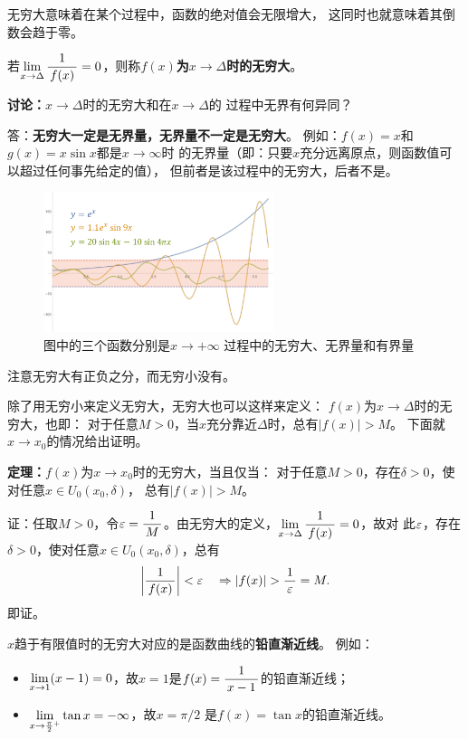 无穷大意味着在某个过程中，函数的绝对值会无限增大，
这同时也就意味着其倒数会趋于零。

\begin{thx}
	若$\lim\limits_{x\to{\Delta}}\displaystyle\frac{\,{1}\,}{\,{f(x)}\,}=0$，则称{\bf $f(x)$为$x\to\Delta$时的无穷大}。
\end{thx}

{\bf 讨论：}$x\to\Delta$时的无穷大和在$x\to\Delta$的
过程中无界有何异同？

\ifhint
答：{\bf 无穷大一定是无界量，无界量不一定是无穷大}。
例如：$f(x)=x$和$g(x)=x\sin x$都是$x\to\infty$时
的无界量（即：只要$x$充分远离原点，则函数值可以超过任何事先给定的值），
但前者是该过程中的无穷大，后者不是。\fin
\fi

\begin{figure}[h]
	\centering
	\includegraphics[width=0.6\textwidth]
	{./Images/Ch01/infvsbded.pdf}
	\caption{图中的三个函数分别是$x\to+\infty$
	过程中的无穷大、无界量和有界量}
	\label{fig:infvsbded}
\end{figure}

注意无穷大有正负之分，而无穷小没有。

\bs

除了用无穷小来定义无穷大，无穷大也可以这样来定义：
$f(x)$为$x\to\Delta$时的无穷大，也即：
对于任意$M>0$，当$x$充分靠近$\Delta$时，总有$|f(x)|>M$。
下面就$x\to x_0$的情况给出证明。

\begin{thx}
	{\bf 定理：}$f(x)$为$x\to x_0$时的无穷大，当且仅当：
	对于任意$M>0$，存在$\delta>0$，使对任意$x\in U_0(x_0,\delta)$，
	总有$|f(x)|>M$。
\end{thx}

证：任取$M>0$，令$\varepsilon=\displaystyle\frac{\,{1}\,}{\,{M}\,}$。由无穷大的定义，$\lim\limits_{x\to{\Delta}}\displaystyle\frac{\,{1}\,}{\,{f(x)}\,}=0$，故对
此$\varepsilon$，存在$\delta>0$，使对任意$x\in U_0(x_0,\delta)$，总有
$$\left|\df1{f(x)}\right|<\e\quad\Rightarrow |f(x)|>\df1{\e}=M.$$
即证。\fin

\bs
$x$趋于有限值时的无穷大对应的是函数曲线的{\bf 铅直渐近线}。
例如：
\begin{itemize}
	\setlength{\itemindent}{1cm}
	\item $\lim\limits_{x\to{1}}(x-1)=0$，故$x=1$是$f(x)=\displaystyle\frac{\,{1}\,}{\,{x-1}\,}$的铅直渐近线；
	\item $\lim\limits_{x\to{\frac{\pi}{2}^+}}\tan x=-\infty$，故$x=\pi/2$
	是$f(x)=\tan x$的铅直渐近线。
\end{itemize}
	

